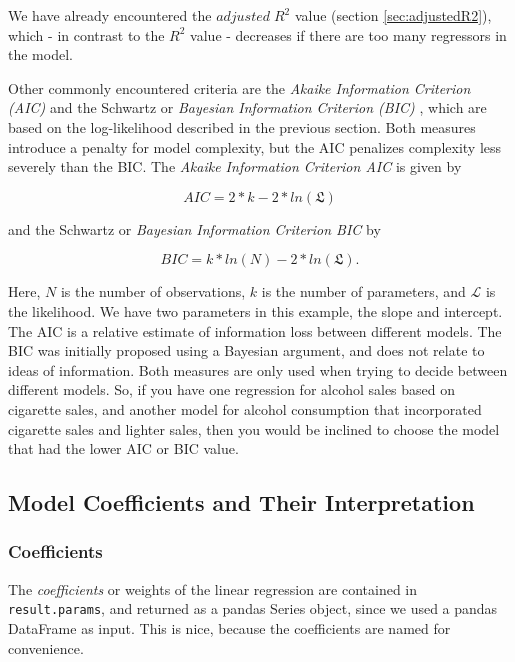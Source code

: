We have already encountered the $adjusted\; R^2$ value (section \ref{sec:adjustedR2}), which - in contrast to the $R^2$ value - decreases if there are too many regressors in the model.

Other commonly encountered criteria are the \emph{Akaike Information Criterion (AIC)}  and the Schwartz or \emph{Bayesian Information Criterion (BIC)} , which are based on the log-likelihood described in the previous section. Both measures introduce a penalty for model complexity, but the AIC penalizes complexity less severely than the BIC.
The \emph{Akaike Information Criterion AIC}  is given by

\begin{equation}
  AIC = 2*k - 2*ln(\mathfrak{L})
\end{equation}

and the Schwartz or \emph{Bayesian Information Criterion BIC}  by

\begin{equation}
  BIC = k*ln(N) - 2*ln(\mathfrak{L}) .
\end{equation}

Here, $N$ is the number of observations, $k$ is the number of parameters, and $\mathcal{L}$ is the likelihood. We have two parameters in this example, the slope and intercept. The AIC is a relative estimate of information loss between different models. The BIC was initially proposed using a Bayesian argument, and does not relate to ideas of information. Both measures are only used when trying to decide between different models. So, if you have one regression for alcohol sales based on cigarette sales, and another model for alcohol consumption that incorporated cigarette sales and lighter sales, then you would be inclined to choose the model that had the lower AIC or BIC value.

\subsection{Model Coefficients and Their Interpretation}

\subsubsection{Coefficients}
The \emph{coefficients} or weights of the linear regression are contained in \lstinline{result.params}, and returned as a pandas Series object, since we used a pandas DataFrame as input. This is nice, because the coefficients are named for convenience.


